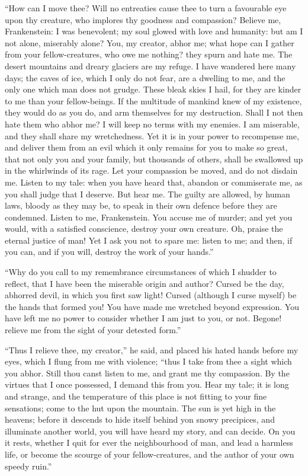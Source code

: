 ``How can I move thee? Will no
entreaties cause thee to turn a favourable
eye upon thy creature, who implores
thy goodness and compassion?
Believe me, Frankenstein: I was benevolent;
my soul glowed with love and
humanity: but am I not alone, miserably
alone? You, my creator, abhor
me; what hope can I gather from
your fellow-creatures, who owe me nothing?
they spurn and hate me. The
desert mountains and dreary glaciers
are my refuge. I have wandered
here many days; the caves of ice,
which I only do not fear, are a dwelling
to me, and the only one which
man does not grudge. These bleak
skies I hail, for they are kinder to me
than your fellow-beings. If the multitude
of mankind knew of my existence,
they would do as you do, and
arm themselves for my destruction.
Shall I not then hate them who abhor
me? I will keep no terms with my
enemies. I am miserable, and they
shall share my wretchedness. Yet it
is in your power to recompense me,
and deliver them from an evil which it
only remains for you to make so
great, that not only you and your
family, but thousands of others, shall be
swallowed up in the whirlwinds of its
rage. Let your compassion be moved,
and do not disdain me. Listen to my
tale: when you have heard that, abandon
or commiserate me, as you shall
judge that I deserve. But hear me.
The guilty are allowed, by human
laws, bloody as they may be, to speak in
their own defence before they are condemned.
Listen to me, Frankenstein.
You accuse me of murder; and yet
you would, with a satisfied conscience,
destroy your own creature. Oh, praise
the eternal justice of man! Yet I ask
you not to spare me: listen to me; and
then, if you can, and if you will, destroy
the work of your hands.''

``Why do you call to my remembrance
circumstances of which I shudder
to reflect, that I have been the miserable
origin and author? Cursed be
the day, abhorred devil, in which you
first saw light! Cursed (although I
curse myself) be the hands that formed
you! You have made me wretched
beyond expression. You have left me
no power to consider whether I am
just to you, or not. Begone! relieve
me from the sight of your detested
form.''

``Thus I relieve thee, my creator,''
he said, and placed his hated hands
before my eyes, which I flung from me
with violence; ``thus I take from thee
a sight which you abhor. Still thou
canst listen to me, and grant me thy
compassion. By the virtues that I
once possessed, I demand this from you.
Hear my tale; it is long and strange,
and the temperature of this place is
not fitting to your fine sensations; come
to the hut upon the mountain. The sun
is yet high in the heavens; before it descends
to hide itself behind yon snowy
precipices, and illuminate another
world, you will have heard my story,
and can decide. On you it rests, whether
I quit for ever the neighbourhood
of man, and lead a harmless life, or
become the scourge of your fellow-creatures,
and the author of your own
speedy ruin.''

